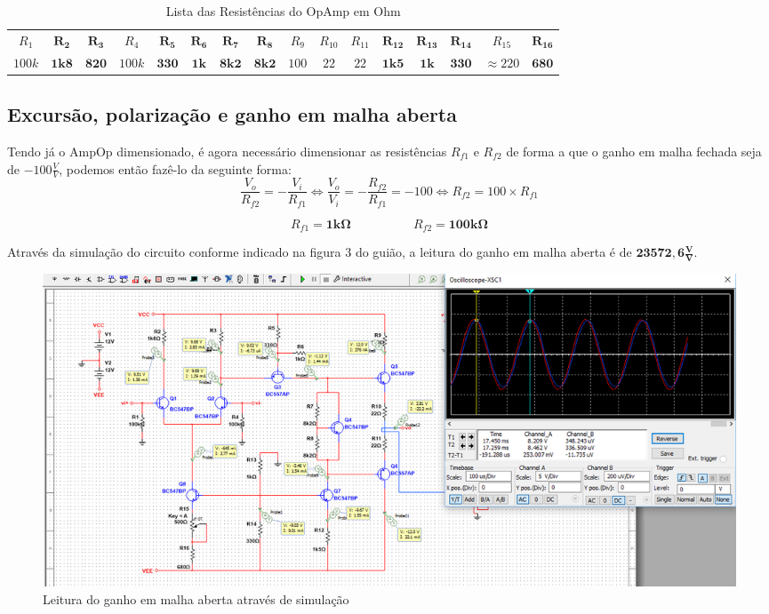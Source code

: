 \documentclass[a4paper]{article}
\begin{document}
        \begin{table}[H]
            \centering
            \hspace*{-0,7cm}\begin{tabular}{|c|c|c|c|c|c|c|c|c|c|c|c|c|c|c|c|}\hline
            $R_1$ & $\bm{R_2}$ & $\bm{R_3}$ & $R_4$ & $\bm{R_5}$ & $\bm{R_6}$ & $\bm{R_7}$ & $\bm{R_8}$ & $R_9$ & $R_{10}$ & $R_{11}$ & $\bm{R_{12}}$ & $\bm{R_{13}}$& $\bm{R_{14}}$ & $R_{15}$ & $\bm{R_{16}}$\\\hhline{|-|-|-|-|-|-|-|-|-|-|-|-|-|-|-|-|}
            $100k$ & $\bm{1k8}$ & $\bm{820}$ & $100k$ & $\bm{330}$ & $\bm{1k}$ & $\bm{8k2}$ & $\bm{8k2}$ & $100$ & $22$ & $22$ & $\bm{1k5}$ & $\bm{1k}$& $\bm{330}$ & $\approx220$ & $\bm{680}$\\\hline
            \end{tabular}
            \caption{\label{tab:resistencias}Lista das Resistências do OpAmp em Ohm}
        \end{table}
        \medskip
    
    \subsection{Excursão, polarização e ganho em malha aberta}
        \bigskip
        Tendo já o AmpOp dimensionado, é agora necessário dimensionar as resistências $R_{f1}$ e $R_{f2}$ de forma a que o ganho em malha fechada seja de $-100 \frac{V}{V}$, podemos então fazê-lo da seguinte forma:
        $$\frac{V_o}{R_{f2}} = -\frac{V_i}{R_{f1}} \Leftrightarrow \frac{V_o}{V_i} = -\frac{R_{f2}}{R_{f1}} = -100 \Leftrightarrow R_{f2} = 100\times R_{f1}$$
        
        $$R_{f1} = \bm{1k\Omega}\qquad \qquad \quad R_{f2} = \bm{100k\Omega}$$ 
        
        Através da simulação do circuito conforme indicado na figura 3 do guião, a leitura do ganho em malha aberta é de $\bm{23572,6 \frac{V}{V}}$.
        \begin{figure}[H]
            \centering
            \includegraphics[width=\textwidth]{figura1_multisim.png}
            \caption{\label{fig:ganhoMultisim}Leitura do ganho em malha aberta através de simulação}
        \end{figure}
        \bigskip
    
\end{document}
